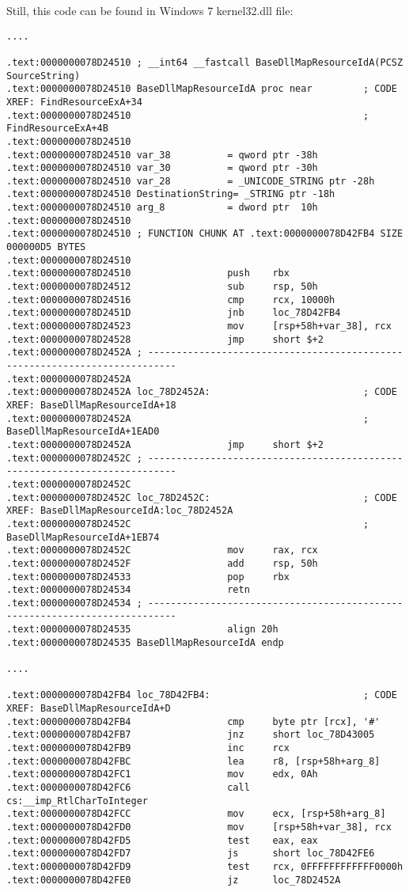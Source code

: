 Still, this code can be found in Windows 7 kernel32.dll file:

\begin{lstlisting}
....

.text:0000000078D24510 ; __int64 __fastcall BaseDllMapResourceIdA(PCSZ SourceString)
.text:0000000078D24510 BaseDllMapResourceIdA proc near         ; CODE XREF: FindResourceExA+34
.text:0000000078D24510                                         ; FindResourceExA+4B
.text:0000000078D24510
.text:0000000078D24510 var_38          = qword ptr -38h
.text:0000000078D24510 var_30          = qword ptr -30h
.text:0000000078D24510 var_28          = _UNICODE_STRING ptr -28h
.text:0000000078D24510 DestinationString= _STRING ptr -18h
.text:0000000078D24510 arg_8           = dword ptr  10h
.text:0000000078D24510
.text:0000000078D24510 ; FUNCTION CHUNK AT .text:0000000078D42FB4 SIZE 000000D5 BYTES
.text:0000000078D24510
.text:0000000078D24510                 push    rbx
.text:0000000078D24512                 sub     rsp, 50h
.text:0000000078D24516                 cmp     rcx, 10000h
.text:0000000078D2451D                 jnb     loc_78D42FB4
.text:0000000078D24523                 mov     [rsp+58h+var_38], rcx
.text:0000000078D24528                 jmp     short $+2
.text:0000000078D2452A ; ---------------------------------------------------------------------------
.text:0000000078D2452A
.text:0000000078D2452A loc_78D2452A:                           ; CODE XREF: BaseDllMapResourceIdA+18
.text:0000000078D2452A                                         ; BaseDllMapResourceIdA+1EAD0
.text:0000000078D2452A                 jmp     short $+2
.text:0000000078D2452C ; ---------------------------------------------------------------------------
.text:0000000078D2452C
.text:0000000078D2452C loc_78D2452C:                           ; CODE XREF: BaseDllMapResourceIdA:loc_78D2452A
.text:0000000078D2452C                                         ; BaseDllMapResourceIdA+1EB74
.text:0000000078D2452C                 mov     rax, rcx
.text:0000000078D2452F                 add     rsp, 50h
.text:0000000078D24533                 pop     rbx
.text:0000000078D24534                 retn
.text:0000000078D24534 ; ---------------------------------------------------------------------------
.text:0000000078D24535                 align 20h
.text:0000000078D24535 BaseDllMapResourceIdA endp

....

.text:0000000078D42FB4 loc_78D42FB4:                           ; CODE XREF: BaseDllMapResourceIdA+D
.text:0000000078D42FB4                 cmp     byte ptr [rcx], '#'
.text:0000000078D42FB7                 jnz     short loc_78D43005
.text:0000000078D42FB9                 inc     rcx
.text:0000000078D42FBC                 lea     r8, [rsp+58h+arg_8]
.text:0000000078D42FC1                 mov     edx, 0Ah
.text:0000000078D42FC6                 call    cs:__imp_RtlCharToInteger
.text:0000000078D42FCC                 mov     ecx, [rsp+58h+arg_8]
.text:0000000078D42FD0                 mov     [rsp+58h+var_38], rcx
.text:0000000078D42FD5                 test    eax, eax
.text:0000000078D42FD7                 js      short loc_78D42FE6
.text:0000000078D42FD9                 test    rcx, 0FFFFFFFFFFFF0000h
.text:0000000078D42FE0                 jz      loc_78D2452A


\end{lstlisting}
